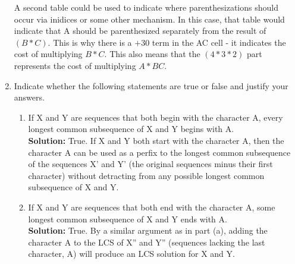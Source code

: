 \documentclass[11pts]{article}
\begin{document}
\begin{enumerate}
  A second table could be used to indicate where parenthesizations
  should occur via inidices or some other mechanism. In this case,
  that table would indicate that A should be
  parenthesized separately from the result of $(B * C)$. This is why there
  is a $+ 30$ term in the AC cell - it indicates the cost of multiplying
  $B * C$. This also means that the $(4 * 3 * 2)$ part represents the cost
  of multiplying $A * BC$. \\
\newpage
\item Indicate whether the following statements are true or false and justify your 
answers. 
\begin{enumerate}
  \item If X and Y are sequences that both begin with the character A,
  every longest common 
  subsequence of X and Y begins with A. \\

  \textbf{Solution:} True. If X and Y both start with the character A,
  then the character A can be used as a perfix to the longest common
  subsequence of the sequences X' and Y' (the original sequences minus
  their first character) without detracting from any possible longest
  common subsequence of X and Y. \\

  \item If X and Y are sequences that both end with the character A,
  some longest common 
  subsequence of X and Y ends with A.\\

  \textbf{Solution:} True. By a similar argument as in part (a), adding the
  character A to the LCS of X'' and Y'' (sequences lacking the last
  character, A) will produce an LCS solution for
  X and Y. \\

\end{enumerate}

\end{enumerate}
\end{document}
